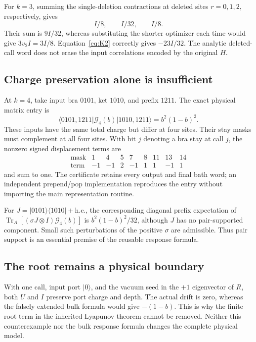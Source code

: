 \documentclass[11pt]{article}
\newcommand{\Tr}{\operatorname{Tr}}
\newcommand{\ket}[1]{\lvert #1\rangle}
\newcommand{\bra}[1]{\langle #1\rvert}
\begin{document}
For \(k=3\), summing the single-deletion contractions at deleted sites
\(r=0,1,2\), respectively, gives
\[
 I/8,\qquad I/32,\qquad I/8.
\]
Their sum is \(9I/32\), whereas substituting the shorter optimizer each
time would give \(3v_2I=3I/8\). Equation~\eqref{eq:K2} correctly gives
\(-23I/32\). The analytic deleted-call word does not erase the input
correlations encoded by the original \(H\).

\subsection{Charge preservation alone is insufficient}

At \(k=4\), take input bra \(0101\), ket \(1010\), and prefix \(1211\).
The exact physical matrix entry is
\begin{equation}\label{eq:fourendpoint}
 \bra{0101,1211}\mathcal G_4(b)\ket{1010,1211}
       =b^2(1-b)^2.
\end{equation}
These inputs have the same total charge but differ at four sites.
Their stay masks must complement at all four sites. With bit \(j\)
denoting a bra stay at call \(j\), the nonzero signed displacement terms are
\[
\begin{array}{c|rrrrrrrr}
 \text{mask}&1&4&5&7&8&11&13&14\\\hline
 \text{term}&-1&-1&2&-1&1&1&-1&1
\end{array}
\]
and sum to one. The certificate retains every output and final bath word;
an independent prepend/pop implementation reproduces the entry without
importing the main representation routine.

For \(J=\ket{0101}\bra{1010}+\mathrm{h.c.}\), the corresponding diagonal
prefix expectation of \(\Tr_A[(\sigma J\otimes I)\mathcal G_4(b)]\)
is \(b^2(1-b)^2/32\), although \(J\) has no pair-supported component.
Small such perturbations of the positive \(\sigma\) are admissible.
Thus pair support is an essential premise of the reusable response formula.

\subsection{The root remains a physical boundary}

With one call, input port \(\ket0\), and the vacuum seed in the \(+1\)
eigenvector of \(R\), both \(U\) and \(I\) preserve port charge and depth.
The actual drift is zero, whereas the falsely extended bulk formula
would give \(-(1-b)\). This is why the finite root term in the inherited
Lyapunov theorem cannot be removed. Neither this counterexample nor the
bulk response formula changes the complete physical model.
\end{document}
